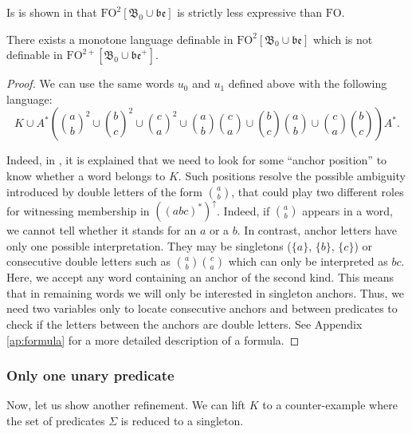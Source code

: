 \documentclass[a4paper,UKenglish,cleveref, autoref, thm-restate]{lipics-v2021}
\newcommand{\FO}{\mathrm{FO}}
\newcommand{\FOtw}{\FO^2}
\newcommand{\FOtwp}{\FO^{2+}}
\newcommand{\be}{\mathfrak{be}}
\newcommand{\bin}{\mathfrak{B}}
\begin{document}
Is is shown in \cite{between} that $\FO^2[\bin_0\cup\be]$ is strictly less expressive than $\FO$.

\begin{proposition} \label{FO2be}
    There exists a monotone language definable in $\FOtw[\bin_0 \cup \be]$ which is not definable in $\FOtwp[\bin_0 \cup \be^+]$.
\end{proposition}




\begin{proof}
    We can use the same words $u_0$ and $u_1$ defined above with the following language:
    $$
    K \cup A^*\left(
        \binom{a}{b}^2 \cup \binom{b}{c}^2 \cup \binom{c}{a}^2 \cup
        \binom{a}{b}\binom{c}{a} \cup
        \binom{b}{c}\binom{a}{b} \cup
        \binom{c}{a}\binom{b}{c}
    \right)A^* .
    $$

    Indeed, in \cite{PFO}, it is explained that we need to look for some ``anchor position'' to know whether a word belongs to $K$. Such positions resolve the possible ambiguity introduced by double letters of the form $\binom{a}{b}$, that could play two different roles for witnessing membership in $((abc)^*)^{\uparrow}$.
    Indeed, if $\binom{a}{b}$ appears in a word, we cannot tell whether it stands for an $a$ or a $b$.
    In contrast, anchor letters have only one possible interpretation.
    They may be singletons ($\{a\}$, $\{b\}$, $\{c\}$) or consecutive double letters such as $\binom{a}{b}\binom{c}{a}$ which can only be interpreted as $bc$.
    Here, we accept any word containing an anchor of the second kind.
    This means that in remaining words we will only be interested in singleton anchors.
    Thus, we need two variables only to locate consecutive anchors and between predicates to check if the letters between the anchors are double letters.
    See Appendix \ref{ap:formula} for a more detailed description of a formula.
    
    
\end{proof}





\subsubsection{Only one unary predicate}\label{sec:onepred}


Now, let us show another refinement.
We can lift $K$ to a counter-example where the set of predicates $\Sigma$ is reduced to a singleton.
\end{document}
